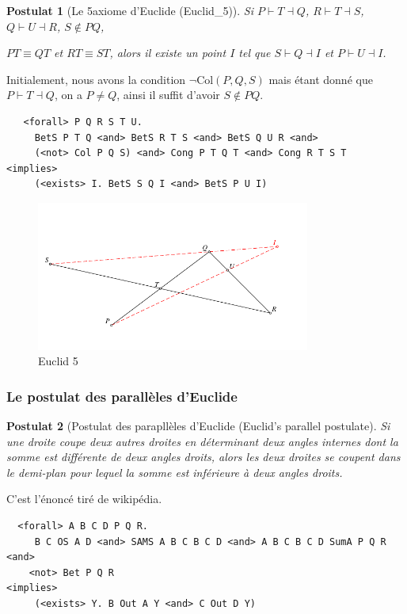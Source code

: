 \documentclass[8pt,a4paper]{article}
\theoremstyle{plain}
\newtheorem{postulat}{Postulat}
\begin{document}
  \begin{postulat}[Le 5\ieme axiome d'Euclide (Euclid\_5)]
Si $P\vdash T\dashv Q$,
$R\vdash T\dashv S$,
$Q\vdash U \dashv R$, $S \not\in PQ$,


$P T \equiv Q T$ et $R T \equiv S T$, alors
il existe un point $I$ tel que $S\vdash Q \dashv I$ et $P \vdash U \dashv I$.
\end{postulat}

Initialement, nous avons la condition $\lnot \text{Col} (P,Q,S)$ mais étant donné que $P\vdash T\dashv Q$,
on a $P \neq Q$, ainsi il suffit d'avoir $S \not\in PQ$.

\begin{tcolorbox}
\begin{verbatim}
   <forall> P Q R S T U.
     BetS P T Q <and> BetS R T S <and> BetS Q U R <and> 
     (<not> Col P Q S) <and> Cong P T Q T <and> Cong R T S T
<implies>
     (<exists> I. BetS S Q I <and> BetS P U I)
\end{verbatim}
  \end{tcolorbox}
  \begin{figure}[H] %
  \centering
    \includegraphics[width=90mm]{fig02.pdf}
\caption{Euclid 5\label{Euclid5}}
\end{figure}

  \subsubsection{Le postulat des parallèles d'Euclide}
  \begin{postulat}[Postulat des parapllèles d'Euclide (Euclid's parallel postulate]
    Si une droite coupe deux autres droites en déterminant deux angles internes
    dont la somme est différente de deux angles droits,
    alors les deux droites se coupent dans le demi-plan
    pour lequel la somme est inférieure à deux angles droits.
  \end{postulat}
  C'est l'énoncé tiré de wikipédia\cite{frwiki:188096497}.
  \begin{tcolorbox}
\begin{verbatim}
  <forall> A B C D P Q R.
     B C OS A D <and> SAMS A B C B C D <and> A B C B C D SumA P Q R <and>
    <not> Bet P Q R 
<implies>
     (<exists> Y. B Out A Y <and> C Out D Y)
\end{verbatim}
  \end{tcolorbox}
  
\end{document}
